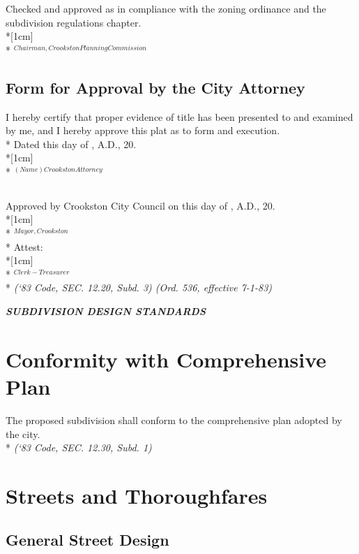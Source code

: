 \subsubsection{}
Checked and approved as in compliance with the zoning ordinance and the subdivision regulations chapter.\\*[1cm]
\fillable{5cm}\\*
$^{Chairman, Crookston Planning Commission}$
\subsection{Form for Approval by the City Attorney}
I hereby certify that proper evidence of title has been presented to and examined by me, and I hereby approve this plat as to form and execution.\\*
Dated this \fillable{1cm} day of \fillable{2cm}, A.D., 20\fillable{1cm}.\\*[1cm]
\fillable{5cm}\\*
$^{(Name) Crookston Attorney}$
\subsection{}
Approved by Crookston City Council on this \fillable{1cm} day of \fillable{2cm}, A.D., 20\fillable{1cm}.\\*[1cm]
\fillable{5cm}\\*
$^{Mayor, Crookston}$\\*
Attest:\\*[1cm]
\fillable{5cm}\\*
$^{Clerk-Treasurer}$\\*
\emph{(‘83 Code, SEC. 12.20, Subd. 3)  (Ord. 536, effective 7-1-83)}

\begin{center}
    \emph{\textbf{\LARGE{SUBDIVISION DESIGN STANDARDS}}}
\end{center}

\setcounter{section}{29}
\section{Conformity with Comprehensive Plan}
The proposed subdivision shall conform to the comprehensive plan adopted by the city.\\*
\emph{(‘83 Code, SEC. 12.30, Subd. 1)}
\section{Streets and Thoroughfares}
\subsection{General Street Design}
